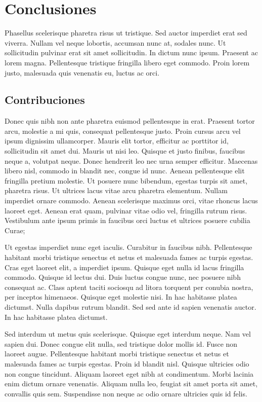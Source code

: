 \chapter{Conclusiones}
\label{chap:conclusions}

Phasellus scelerisque pharetra risus ut tristique. Sed auctor imperdiet erat sed viverra. Nullam vel neque lobortis, accumsan nunc at, sodales nunc. Ut sollicitudin pulvinar erat sit amet sollicitudin. In dictum nunc ipsum. Praesent ac lorem magna. Pellentesque tristique fringilla libero eget commodo. Proin lorem justo, malesuada quis venenatis eu, luctus ac orci.


\section{Contribuciones}
\label{sec:contributions}
Donec quis nibh non ante pharetra euismod pellentesque in erat. Praesent tortor arcu, molestie a mi quis, consequat pellentesque justo. Proin cursus arcu vel ipsum dignissim ullamcorper. Mauris elit tortor, efficitur ac porttitor id, sollicitudin sit amet dui. Mauris ut nisi leo. Quisque et justo finibus, faucibus neque a, volutpat neque. Donec hendrerit leo nec urna semper efficitur. Maecenas libero nisl, commodo in blandit nec, congue id nunc. Aenean pellentesque elit fringilla pretium molestie. Ut posuere nunc bibendum, egestas turpis sit amet, pharetra risus. Ut ultrices lacus vitae arcu pharetra elementum. Nullam imperdiet ornare commodo. Aenean scelerisque maximus orci, vitae rhoncus lacus laoreet eget. Aenean erat quam, pulvinar vitae odio vel, fringilla rutrum risus. Vestibulum ante ipsum primis in faucibus orci luctus et ultrices posuere cubilia Curae;

Ut egestas imperdiet nunc eget iaculis. Curabitur in faucibus nibh. Pellentesque habitant morbi tristique senectus et netus et malesuada fames ac turpis egestas. Cras eget laoreet elit, a imperdiet ipsum. Quisque eget nulla id lacus fringilla commodo. Quisque id lectus dui. Duis luctus congue nunc, nec posuere nibh consequat ac. Class aptent taciti sociosqu ad litora torquent per conubia nostra, per inceptos himenaeos. Quisque eget molestie nisi. In hac habitasse platea dictumst. Nulla dapibus rutrum blandit. Sed sed ante id sapien venenatis auctor. In hac habitasse platea dictumst.

Sed interdum ut metus quis scelerisque. Quisque eget interdum neque. Nam vel sapien dui. Donec congue elit nulla, sed tristique dolor mollis id. Fusce non laoreet augue. Pellentesque habitant morbi tristique senectus et netus et malesuada fames ac turpis egestas. Proin id blandit nisl. Quisque ultricies odio non congue tincidunt. Aliquam laoreet eget nibh at condimentum. Morbi lacinia enim dictum ornare venenatis. Aliquam nulla leo, feugiat sit amet porta sit amet, convallis quis sem. Suspendisse non neque ac odio ornare ultricies quis id felis.


